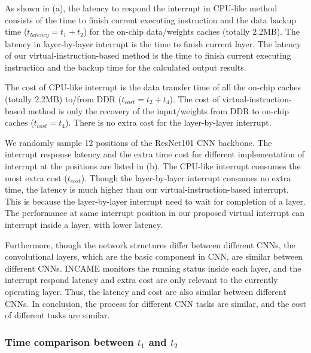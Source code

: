 As shown in (a), the latency to respond the interrupt in CPU-like method consists of the time to finish current executing instruction and the data backup time ($t_{latency} = t_1+t_2$) for the on-chip data/weights caches (totally 2.2MB). The latency in layer-by-layer interrupt is the time to finish current layer. The latency of our virtual-instruction-based method is the time to finish current executing instruction and the backup time for the calculated output results. 

The cost of CPU-like interrupt is the data transfer time of all the on-chip caches (totally 2.2MB) to/from DDR ($t_{cost} = t_2+t_4$). The cost of virtual-instruction-based method is only the recovery of the input/weights from DDR to on-chip caches ($t_{cost} = t_4$). There is no extra cost for the layer-by-layer interrupt.



We randomly sample 12 positions of the ResNet101 CNN backbone. The interrupt response latency and the extra time cost for different implementation of interrupt at the positions are listed in (b).
The CPU-like interrupt consumes the most extra cost ($t_{cost}$). Though the layer-by-layer interrupt consumes no extra time, the latency is much higher than our virtual-instruction-based interrupt. 
This is because the layer-by-layer interrupt need to wait for completion of a layer. The performance at same interrupt position in our proposed virtual interrupt can interrupt inside a layer, with lower latency.

Furthermore, though the network structures differ between different CNNs, the convolutional layers, which are the basic component in CNN, are similar between different CNNs. INCAME monitors the running status inside each layer, and the interrupt respond latency and extra cost are only relevant to the currently operating layer. Thus, the latency and cost are also similar between different CNNs. In conclusion, the process for different CNN tasks are similar, and the cost of different tasks are similar.

\subsubsection{ Time comparison between $t_1$ and $t_2$ }

